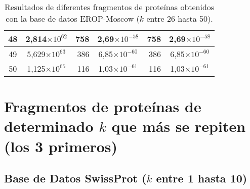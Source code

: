 \begin{table}[!hbt]
\begin{tabular}{| c  r  r  c  r  c |}
    48 & \multicolumn{1}{c}{2,814$\times 10^{62}$} & 758 & 2,69$\times 10^{-58}$ & 758 & 2,69$\times 10^{-58}$ \\ \hline  
    49 & \multicolumn{1}{c}{5,629$\times 10^{63}$} & 386 & 6,85$\times 10^{-60}$ & 386 & 6,85$\times 10^{-60}$ \\ \hline
    50 & \multicolumn{1}{c}{1,125$\times 10^{65}$} & 116 & 1,03$\times 10^{-61}$ & 116 & 1,03$\times 10^{-61}$ \\ \hline       
    \end{tabular}
    \caption{Resultados de diferentes fragmentos de proteínas obtenidos con la base de datos EROP-Moscow ($k$ entre 26 hasta 50).}
    \label{tb:labela32}
\end{table}

\newpage

\section*{Fragmentos de proteínas de determinado $k$ que más se repiten (los 3 primeros)}

\subsection*{Base de Datos SwissProt ($k$ entre 1 hasta 10)}

